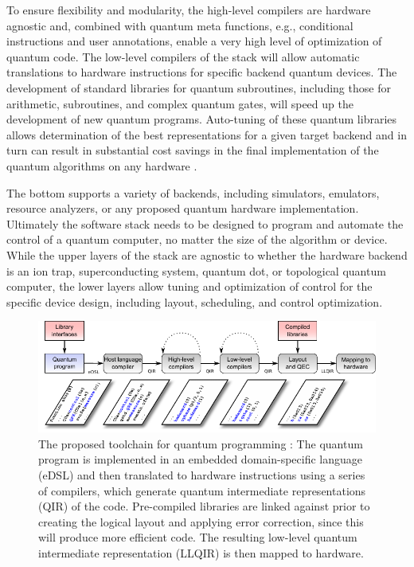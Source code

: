 \documentclass[journal]{IEEEtran}
\begin{document}
To ensure flexibility and modularity, the high-level compilers are hardware agnostic and, combined with quantum meta functions, e.g., conditional instructions and user annotations, enable a very high level of optimization of quantum code.  
The low-level compilers of the stack will allow automatic translations to hardware instructions for specific backend quantum devices.  The development of standard libraries for quantum subroutines, including those for arithmetic, subroutines, and complex quantum gates, will speed up the development of new quantum programs.
Auto-tuning of these quantum libraries allows determination of the best representations for a given target backend and in turn can result in substantial cost savings in the final implementation of the quantum algorithms on any hardware \cite{stack}.  

The bottom supports a variety of backends, including simulators, emulators, resource analyzers, or any proposed quantum hardware implementation.
Ultimately the software stack needs to be designed to program and automate the control of a quantum computer, no matter the size of the algorithm or device.
While the upper layers of the stack are agnostic to whether the hardware backend is an ion trap, superconducting system, quantum dot, or topological quantum computer, the lower layers allow tuning and optimization of control for the specific device design, including layout, scheduling, and control optimization.


\begin{figure}[t]
\centering
\includegraphics[width=\textwidth]{figures/coarse_toolchain}
\caption{The proposed toolchain for quantum programming \cite{stack}: The quantum program is implemented in an embedded domain-specific language (eDSL) and then translated to hardware instructions using a series of compilers, which generate quantum intermediate representations (QIR) of the code. Pre-compiled libraries are linked against prior to creating the logical layout and applying error correction, since this will produce more efficient code. The resulting low-level quantum intermediate representation (LLQIR) is then mapped to hardware.}
\label{fig:toolchain}
\end{figure}
\end{document}
